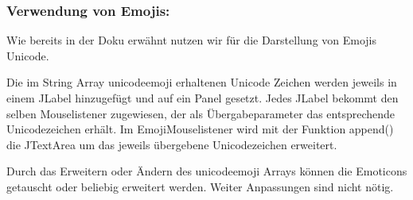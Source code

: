 \begin{itemize}
    \subsubsection*{Verwendung von Emojis:}
	Wie bereits in der Doku erwähnt nutzen wir für die Darstellung von Emojis Unicode.
	
	Die im String Array unicodeemoji erhaltenen Unicode Zeichen werden jeweils in einem JLabel hinzugefügt und auf ein Panel gesetzt. Jedes JLabel bekommt den selben Mouselistener zugewiesen, der als Übergabeparameter das entsprechende Unicodezeichen erhält. Im EmojiMouselistener wird mit der Funktion append() die JTextArea um das jeweils übergebene Unicodezeichen erweitert.
	
	Durch das Erweitern oder Ändern des unicodeemoji Arrays können die Emoticons getauscht oder beliebig erweitert werden. Weiter Anpassungen sind nicht nötig.
\end{itemize}


